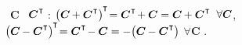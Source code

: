 ~${\bm{C}}$
~${\bm{C}^{\hspace{.1ex}\T}\hspace{-0.2ex}}$
\::
${\bigl( \bm{C} \hspace{-0.1ex} + \bm{C}^{\hspace{.1ex}\T} \bigr)^{\hspace{-0.1ex}\T} \hspace{-0.4ex}
= \bm{C}^{\hspace{.1ex}\T} \hspace{-0.3ex} + \bm{C}
= \bm{C} \hspace{-0.1ex} + \bm{C}^{\hspace{.1ex}\T} \hspace{-0.3ex}}$
${\hspace{.5ex} \forall \bm{C}}$,
${\bigl( \bm{C} \hspace{-0.1ex} - \bm{C}^{\hspace{.1ex}\T} \bigr)^{\hspace{-0.1ex}\T} \hspace{-0.4ex}
= \bm{C}^{\hspace{.1ex}\T} \hspace{-0.3ex} - \bm{C}
= - \bigl( \bm{C} \hspace{-0.1ex} - \bm{C}^{\hspace{.1ex}\T} \bigr)}$
${\forall \bm{C}}$
.

